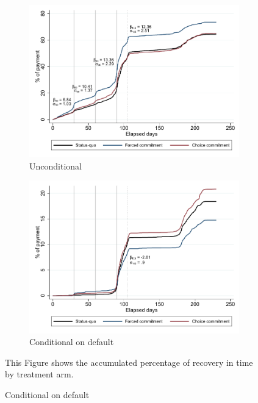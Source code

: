 \documentclass[oneside,11pt]{article}
\begin{document}
\begin{figure}[H]
        \caption{\% of payment over time}
    \label{survival_graph}
    \begin{center}
   \begin{subfigure}{0.49\textwidth}
        \caption{Unconditional}
        \centering
        \includegraphics[width=\textwidth]{Figuras/cumulative_porc_pay_time.pdf}
    \end{subfigure} 
   \begin{subfigure}{0.49\textwidth}
        \caption{Conditional on default}
        \centering
        \includegraphics[width=\textwidth]{Figuras/cumulative_porc_pay_time_default.pdf}
    \end{subfigure}     
    \end{center}
     \scriptsize  This Figure shows the accumulated percentage of recovery in time by treatment arm. 
\end{figure}
\end{document}
